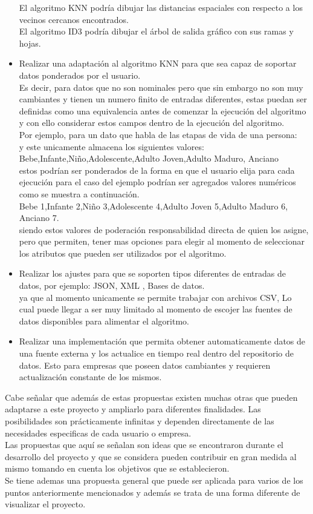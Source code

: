 \begin{itemize}
	El algoritmo KNN podría dibujar las distancias espaciales con respecto a los vecinos cercanos encontrados.\\
	El algoritmo ID3 podría dibujar el árbol de salida gráfico con sus ramas y hojas.\\
	\item Realizar una adaptación al algoritmo KNN para que sea capaz de soportar datos ponderados por el usuario. \\
	Es decir, para datos que no son nominales pero que sin embargo no son muy cambiantes y tienen un numero finito de entradas diferentes, estas puedan ser definidas como una equivalencia antes de comenzar la ejecución del algoritmo y con ello considerar estos campos dentro de la ejecución del algoritmo.\\
	Por ejemplo, para un dato que habla de las etapas de vida de una persona: \\
	y este unicamente almacena los siguientes valores: 
	Bebe,Infante,Niño,Adolescente,Adulto Joven,Adulto Maduro, Anciano\\
	estos podrían ser ponderados de la forma en que el usuario elija para cada ejecución para el caso del ejemplo podrían ser agregados valores numéricos como se muestra a continuación.\\
	Bebe 1,Infante 2,Niño 3,Adolescente 4,Adulto Joven 5,Adulto Maduro 6, Anciano 7.\\
	siendo estos valores de poderación responsabilidad directa de quien los asigne, pero que permiten, tener mas opciones para elegir al momento de seleccionar los atributos que pueden ser utilizados por el algoritmo.\\
	\item Realizar los ajustes para que se soporten tipos diferentes de entradas de datos, por ejemplo: JSON, XML , Bases de datos. \\
	ya que al momento unicamente se permite trabajar con archivos CSV, Lo cual puede llegar a ser muy limitado al momento de escojer las fuentes de datos disponibles para alimentar el algoritmo.\\
	\item Realizar una implementación que permita obtener automaticamente datos de una fuente externa y los actualice en tiempo real dentro del repositorio de datos. Esto para empresas que poseen datos cambiantes y requieren actualización constante de los mismos.    
\end{itemize}   
Cabe señalar que además de estas propuestas existen muchas otras que pueden adaptarse a este proyecto y ampliarlo para diferentes finalidades. Las posibilidades son prácticamente infinitas y dependen directamente de las necesidades especificas de cada usuario o empresa. 
\\
Las propuestas que aquí se señalan son ideas que se encontraron durante el desarrollo del proyecto y que se considera pueden contribuir en gran medida al mismo tomando en cuenta los objetivos que se establecieron.\\
Se tiene ademas una propuesta general que puede ser aplicada para varios de los puntos anteriormente mencionados y además se trata de una forma diferente de visualizar el proyecto.\\
